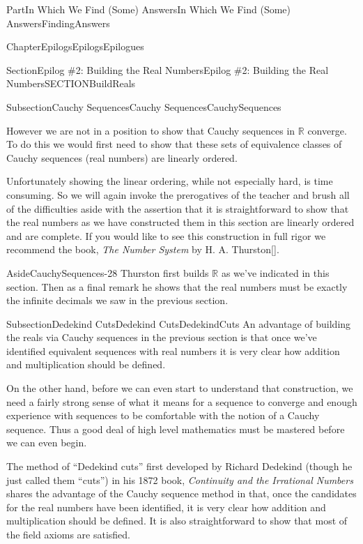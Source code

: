 \documentclass[oneside,10pt,]{book}
\newcommand{\xreffont}{\relax}
\newcommand{\pubtitle}[1]{\textsl{#1}}
\numberwithin{equation}{part}
\newcommand{\RR}{\mathbb {R}}
\begin{document}
\begin{partptx}{Part}{In Which We Find (Some) Answers}{}{In Which We Find (Some) Answers}{}{}{FindingAnswers}
\begin{chapterptx}{Chapter}{Epilogs}{}{Epilogs}{}{}{Epilogues}
\begin{sectionptx}{Section}{Epilog \#2: Building the Real Numbers}{}{Epilog \#2: Building the Real Numbers}{}{}{SECTIONBuildReals}
\begin{subsectionptx}{Subsection}{Cauchy Sequences}{}{Cauchy Sequences}{}{}{CauchySequences}
\par
However we are not in a position to show that Cauchy sequences in \(\RR\) converge.  To do this we would first need to show that these sets of equivalence classes of Cauchy sequences (real numbers) are linearly ordered.%
\par
Unfortunately showing the linear ordering, while not especially hard, is time consuming.  So we will again invoke the prerogatives of the teacher and brush all of the difficulties aside with the assertion that it is straightforward to show that the real numbers as we have constructed them in this section are linearly ordered and are complete.  If you would like to see this construction in full rigor we recommend the book, \pubtitle{The Number System} by H. A. Thurston\hyperlink{thurston56__number_system}{[{\xreffont 16}]}.%
\begin{aside}{Aside}{}{CauchySequences-28}%
Thurston first builds \(\RR\) as we've indicated in this section.  Then as a final remark he shows that the real numbers must be exactly the infinite decimals we saw in the previous section.%
\end{aside}
\end{subsectionptx}
%
%
\typeout{************************************************}
\typeout{************************************************}
%
\begin{subsectionptx}{Subsection}{Dedekind Cuts}{}{Dedekind Cuts}{}{}{DedekindCuts}
An advantage of building the reals via Cauchy sequences in the previous section is that once we've identified equivalent sequences with real numbers it is very clear how addition and multiplication should be defined.%
\par
On the other hand, before we can even start to understand that construction, we need a fairly strong sense of what it means for a sequence to converge and enough experience with sequences to be comfortable with the notion of a Cauchy sequence.  Thus a good deal of high level mathematics must be mastered before we can even begin.%
\par
{} The method of ``Dedekind cuts'' first developed by Richard Dedekind (though he just called them ``cuts'') in his 1872 book, \pubtitle{Continuity and the Irrational Numbers} shares the advantage of the Cauchy sequence method in that, once the candidates for the real numbers have been identified, it is very clear how addition and multiplication should be defined.  It is also straightforward to show that most of the field axioms are satisfied.%

\end{subsectionptx}
\end{sectionptx}
\end{chapterptx}
\end{partptx}
\end{document}
